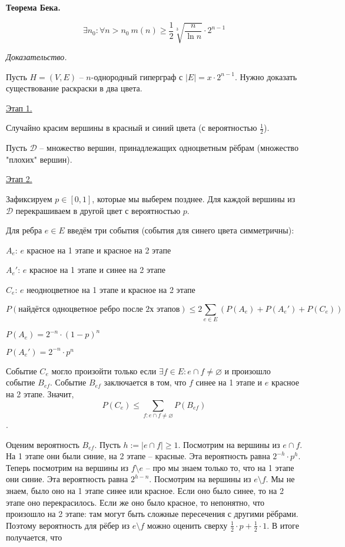 \textbf{Теорема Бека.}

$$
\exists n_0 : \forall n > n_0 \ 
m(n) \geqslant \frac{1}{2} \sqrt[3]{\frac{n}{\ln n}} \cdot 2^{n - 1}
$$

\textit{Доказательство.}

Пусть $H = (V, E)$ -- $n$-однородный гиперграф с $|E| = x \cdot 2^{n - 1}$.
Нужно доказать существование раскраски в два цвета.

\underline{Этап 1.}

Случайно красим вершины в красный и синий цвета (с вероятностью $\frac{1}{2}$).

Пусть $\mathcal{D}$ -- множество вершин, принадлежащих одноцветным рёбрам
(множество "плохих" вершин).

\underline{Этап 2.}

Зафиксируем $p \in [0, 1]$, которые мы выберем позднее.
Для каждой вершины из $\mathcal{D}$ перекрашиваем в другой цвет с вероятностью $p$.

Для ребра $e \in E$ введём три события (события для синего цвета симметричны):

$A_e$: $e$ красное на 1 этапе и красное на 2 этапе

$A_e'$: $e$ красное на 1 этапе и синее на 2 этапе

$C_e$: $e$ неодноцветное на 1 этапе и красное на 2 этапе

$$
P(\text{найдётся одноцветное ребро после 2х этапов}) \leqslant
2 \sum_{e \in E} \left( P(A_e) + P(A_e') + P(C_e) \right)
$$

$P(A_e) = 2^{-n} \cdot (1 - p)^n$

$P(A_e') = 2^{-n} \cdot p^n$

Событие $C_e$ могло произойти только если 
$\exists f \in E : e \cap f \neq \varnothing$ и произошло событие $B_{ef}$. Событие $B_{ef}$
заключается в том, что $f$ синее на 1 этапе и $e$ красное на 2 этапе. Значит, 
$$
P(C_e) \leqslant \sum_{f : e \cap f \neq \varnothing} P(B_{ef})
$$.

Оценим вероятность $B_{ef}$. Пусть $h := |e \cap f| \geqslant 1$. Посмотрим на вершины из
$e \cap f$. На 1 этапе они были синие, на 2 этапе -- красные. Эта вероятность равна
$2^{-h} \cdot p^h$. Теперь посмотрим на вершины из $f \setminus e$ -- про мы знаем только то, что на 1 этапе они синие. Эта вероятность равна $2^{h - n}$. Посмотрим на вершины из
$e \setminus f$. Мы не знаем, было оно на 1 этапе синее или красное. Если оно было синее, 
то на 2 этапе оно перекрасилось. Если же оно было красное, то непонятно, что произошло на
2 этапе: там могут быть сложные пересечения с другими рёбрами. Поэтому вероятность для
рёбер из $e \setminus f$ можно оценить сверху $\frac{1}{2} \cdot p + \frac{1}{2} \cdot 1$.
В итоге получается, что

